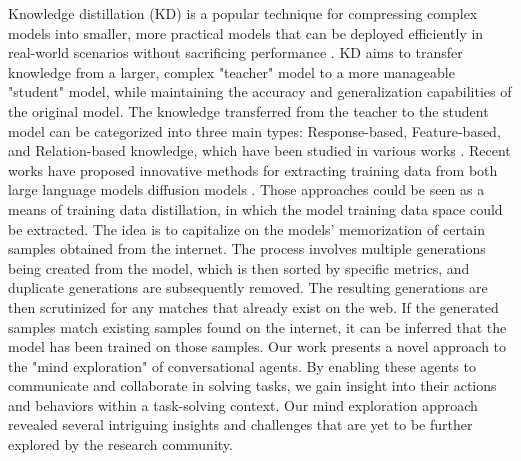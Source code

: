  Knowledge distillation (KD) is a popular technique for compressing complex models into smaller, more practical models that can be deployed efficiently in real-world scenarios without sacrificing performance \cite{hinton2015distilling}. KD aims to transfer knowledge from a larger, complex "teacher" model to a more manageable "student" model, while maintaining the accuracy and generalization capabilities of the original model. The knowledge transferred from the teacher to the student model can be categorized into three main types: Response-based, Feature-based, and Relation-based knowledge, which have been studied in various works \cite{ba2014deep,hinton2015distilling,romero2014fitnets,kimparaphrasing,zagoruyko2016paying,koh2017understanding,heo2019knowledge,chen2021cross,passban2021alp,park2019relational}. Recent works have proposed innovative methods for extracting training data from both large language models \cite{carlini2020extracting} diffusion models \cite{carlini2023extracting}. Those approaches could be seen as a means of training data distillation, in which the model training data space could be extracted. The idea is to capitalize on the models' memorization of certain samples obtained from the internet. The process involves multiple generations being created from the model, which is then sorted by specific metrics, and duplicate generations are subsequently removed. The resulting generations are then scrutinized for any matches that already exist on the web. If the generated samples match existing samples found on the internet, it can be inferred that the model has been trained on those samples.
Our work presents a novel approach to the "mind exploration" of conversational agents. By enabling these agents to communicate and collaborate in solving tasks, we gain insight into their actions and behaviors within a task-solving context. Our mind exploration approach revealed several intriguing insights and challenges that are yet to be further explored by the research community.

